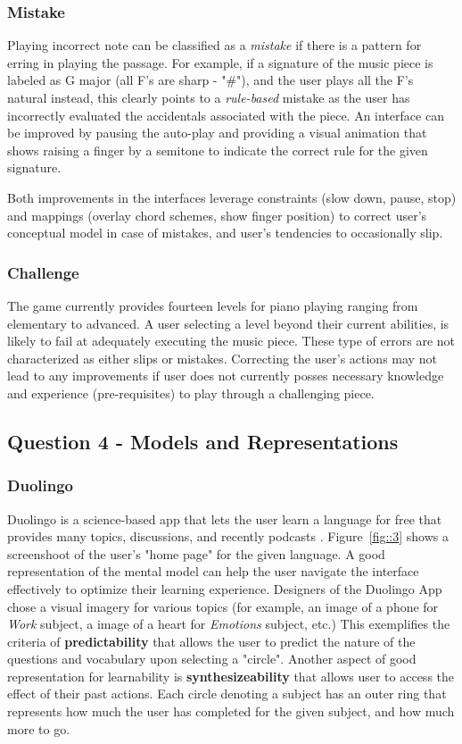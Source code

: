 \documentclass[12pt,letterpaper]{article}
\begin{document}
\subsubsection*{Mistake}
Playing incorrect note can be classified as a \textit{mistake} if there is a pattern for erring in playing the passage. For example, if a signature of the music piece is labeled as G major (all F's are sharp - "\#"), and the user plays all the F's natural instead, this clearly points to a \textit{rule-based} mistake as the user has incorrectly evaluated the accidentals associated with the piece. An interface can be improved by pausing the auto-play and providing a visual animation that shows raising a finger by a semitone to indicate the correct rule for the given signature.

Both improvements in the interfaces leverage constraints (slow down, pause, stop) and mappings (overlay chord schemes, show finger position) to correct user's conceptual model in case of mistakes, and user's tendencies to occasionally slip.

\subsubsection*{Challenge}
The game currently provides fourteen levels for piano playing ranging from elementary to advanced. A user selecting a level beyond their current abilities, is likely to fail at adequately executing the music piece. These type of errors are not characterized as either slips or mistakes. Correcting the user's actions may not lead to any improvements if user does not currently posses necessary knowledge and experience (pre-requisites) to play through a challenging piece.  

\subsection*{Question 4 - Models and Representations}

\subsubsection*{Duolingo}
Duolingo is a science-based app that lets the user learn a language for free that provides many topics, discussions, and recently podcasts \cite{von2013duolingo}. Figure~\ref{fig::3} shows a screenshoot of the user's "home page" for the given language. A good representation of the mental model can help the user navigate the interface effectively to optimize their learning experience. Designers of the Duolingo App chose a visual imagery for various topics (for example, an image of a phone for \textit{Work} subject, a image of a heart for \textit{Emotions} subject, etc.) This exemplifies the criteria of \textbf{predictability} that allows the user to predict the nature of the questions and vocabulary upon selecting a "circle". Another aspect of good representation for learnability is \textbf{synthesizeability} that allows user to access the effect of their past actions. Each circle denoting a subject has an outer ring that represents how much the user has completed for the given subject, and how much more to go.
\end{document}

